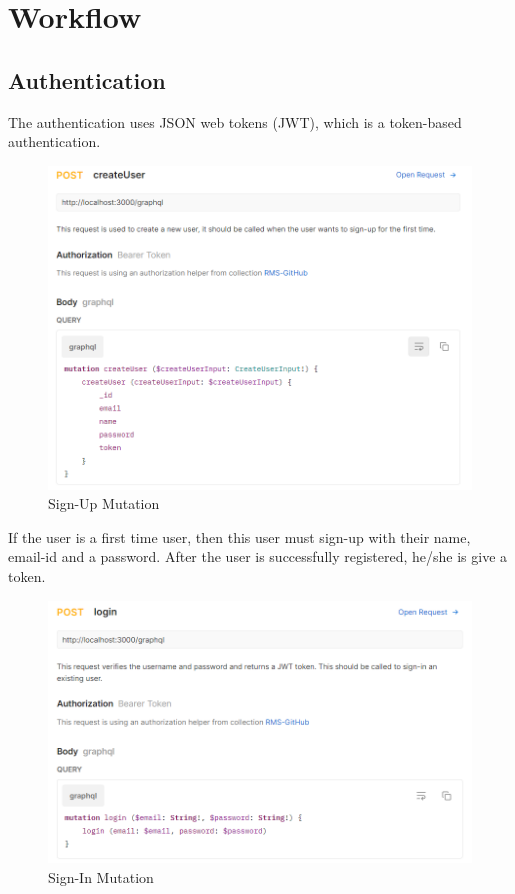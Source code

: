 \chapter{Workflow}
\section{Authentication}
The authentication uses JSON web tokens (JWT), which is a token-based authentication.\\
\begin{figure}[H]
    \centering
    \includegraphics[scale=0.4]{images/createUserMutation.png}
    \caption{Sign-Up Mutation}
    \label{fig:tech-stack}
\end{figure}
If the user is a first time user, then this user must sign-up with their name, email-id and a password. After the user is successfully registered, he/she is give a token.\\
\begin{figure}[H]
    \centering
    \includegraphics[scale=0.4]{images/loginMutation.png}
    \caption{Sign-In Mutation}
    \label{fig:tech-stack}
\end{figure}
